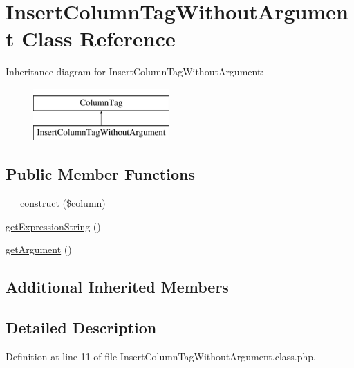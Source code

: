 \hypertarget{classInsertColumnTagWithoutArgument}{\section{Insert\-Column\-Tag\-Without\-Argument Class Reference}
\label{classInsertColumnTagWithoutArgument}
}
Inheritance diagram for Insert\-Column\-Tag\-Without\-Argument\-:\begin{figure}[H]
\begin{center}
\leavevmode
\includegraphics[height=2.000000cm]{classInsertColumnTagWithoutArgument}
\end{center}
\end{figure}
\subsection*{Public Member Functions}
\begin{DoxyCompactItemize}
\item 
\hyperlink{classInsertColumnTagWithoutArgument_aba33ee41cea75031c025f6a7ea970e4c}{\-\_\-\-\_\-construct} (\$column)
\item 
\hyperlink{classInsertColumnTagWithoutArgument_a0ea3febe1aed5e5f0fd8ac97fb0a8ac6}{get\-Expression\-String} ()
\item 
\hyperlink{classInsertColumnTagWithoutArgument_a728f587b2a45ff2b56c1f883197a3c4c}{get\-Argument} ()
\end{DoxyCompactItemize}
\subsection*{Additional Inherited Members}


\subsection{Detailed Description}


Definition at line 11 of file Insert\-Column\-Tag\-Without\-Argument.\-class.\-php.



